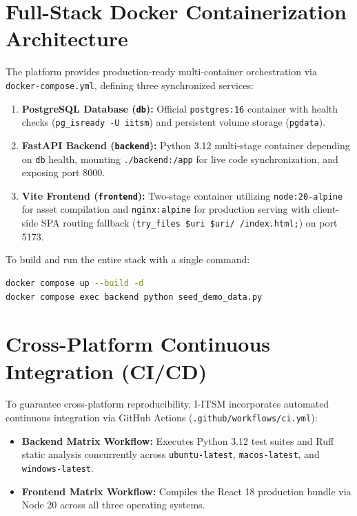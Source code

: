 \documentclass[11pt,a4paper,oneside]{report}
\begin{document}
\section{Full-Stack Docker Containerization Architecture}
\label{sec:ops_docker}
The platform provides production-ready multi-container orchestration via \texttt{docker-compose.yml}, defining three synchronized services:
\begin{enumerate}
    \item \textbf{PostgreSQL Database (\texttt{db}):} Official \texttt{postgres:16} container with health checks (\texttt{pg\_isready -U iitsm}) and persistent volume storage (\texttt{pgdata}).
    \item \textbf{FastAPI Backend (\texttt{backend}):} Python 3.12 multi-stage container depending on \texttt{db} health, mounting \texttt{./backend:/app} for live code synchronization, and exposing port 8000.
    \item \textbf{Vite Frontend (\texttt{frontend}):} Two-stage container utilizing \texttt{node:20-alpine} for asset compilation and \texttt{nginx:alpine} for production serving with client-side SPA routing fallback (\texttt{try\_files \$uri \$uri/ /index.html;}) on port 5173.
\end{enumerate}

To build and run the entire stack with a single command:
\begin{lstlisting}[language=bash, caption={One-Command Docker Compose Launch}]
docker compose up --build -d
docker compose exec backend python seed_demo_data.py
\end{lstlisting}

\section{Cross-Platform Continuous Integration (CI/CD)}
\label{sec:ops_ci}
To guarantee cross-platform reproducibility, I-ITSM incorporates automated continuous integration via GitHub Actions (\texttt{.github/workflows/ci.yml}):
\begin{itemize}
    \item \textbf{Backend Matrix Workflow:} Executes Python 3.12 test suites and Ruff static analysis concurrently across \texttt{ubuntu-latest}, \texttt{macos-latest}, and \texttt{windows-latest}.
    \item \textbf{Frontend Matrix Workflow:} Compiles the React 18 production bundle via Node 20 across all three operating systems.
\end{itemize}
\end{document}
